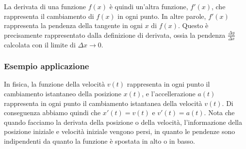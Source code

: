 \documentclass{article}
\begin{document}
    \begin{minipage}{0.5\textwidth}
\end{minipage}
\begin{minipage}{0.5\textwidth}
    La derivata di una funzione \(f(x)\) è quindi un'altra funzione, \(f'(x)\), che
    rappresenta il cambiamento di \(f(x)\) in ogni punto. In altre parole, \(f'(x)\)
    rappresenta la pendenza della tangente in ogni \(x\) di \(f(x)\).
    Questo è precisamente rappresentato dalla definizione di derivata, ossia la pendenza
    \(\frac{\Delta y}{\Delta x}\) calcolata con il limite di \(\Delta x \to 0\).
\end{minipage}

\subsubsection{Esempio applicazione}

In fisica, la funzione della velocità \(v(t)\) rappresenta in ogni punto il cambiamento istantaneo
della posizione \(x(t)\), e l'accellerazione \(a(t)\) rappresenta in ogni punto il cambiamento
istantanea della velocità \(v(t)\).
Di conseguenza abbiamo quindi che \(x'(t)=v(t)\) e \(v'(t)=a(t)\).
Nota che quando facciamo la derivata della posizione o della velocità, l'informazione
della posizione iniziale e velocità iniziale vengono persi, in quanto le pendenze
sono indipendenti da quanto la funzione è spostata in alto o in basso.
\end{document}
